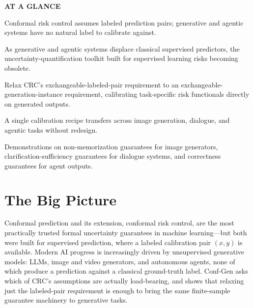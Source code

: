 \documentclass[10pt,twocolumn]{article}
\begin{document}
\begin{mdframed}[backgroundcolor=boxgray,linecolor=rulered,linewidth=1pt,
    innerleftmargin=6pt,innerrightmargin=6pt,
    innertopmargin=6pt,innerbottommargin=6pt]
\textbf{\small AT A GLANCE}\par\vspace{4pt}
\begin{description}[leftmargin=0pt,labelsep=4pt,itemsep=2pt,parsep=0pt,
    font=\small\bfseries]
  \item[Problem:] Conformal risk control assumes labeled prediction
    pairs; generative and agentic systems have no natural label to
    calibrate against.
  \item[Why it matters:] As generative and agentic systems displace
    classical supervised predictors, the uncertainty-quantification
    toolkit built for supervised learning risks becoming obsolete.
  \item[Method:] Relax CRC's exchangeable-labeled-pair requirement to
    an exchangeable-generation-instance requirement, calibrating
    task-specific risk functionals directly on generated outputs.
  \item[Result:] A single calibration recipe transfers across image
    generation, dialogue, and agentic tasks without redesign.
  \item[Evidence:] Demonstrations on non-memorization guarantees for
    image generators, clarification-sufficiency guarantees for
    dialogue systems, and correctness guarantees for agent outputs.
\end{description}
\end{mdframed}

\section{The Big Picture}

Conformal prediction and its extension, conformal risk control, are the
most practically trusted formal uncertainty guarantees in machine
learning---but both were built for supervised prediction, where a
labeled calibration pair $(x, y)$ is available. Modern AI progress is
increasingly driven by unsupervised generative models: LLMs, image and
video generators, and autonomous agents, none of which produce a
prediction against a classical ground-truth label. Conf-Gen asks which
of CRC's assumptions are actually load-bearing, and shows that relaxing
just the labeled-pair requirement is enough to bring the same
finite-sample guarantee machinery to generative tasks.
\end{document}
